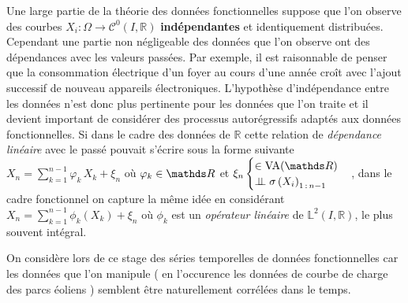 Une large partie de la théorie des données fonctionnelles suppose que l'on observe des courbes $X_i : \Omega \rightarrow \mathcal C^0(I, \mathds R)$ \textbf{indépendantes} et identiquement distribuées. Cependant une partie non négligeable des données que l'on observe ont des dépendances avec les valeurs passées. Par exemple, il est raisonnable de penser que la consommation électrique d'un foyer au cours d'une année croît avec l'ajout successif de nouveau appareils électroniques. L'hypothèse d'indépendance entre les données n'est donc plus pertinente pour les données que l'on traite et il devient important de considérer des processus autorégressifs adaptés aux données fonctionnelles. 
Si dans le cadre des données de $\mathds R$ cette relation de \emph{dépendance linéaire} avec le passé pouvait s'écrire sous la forme suivante 
$X_n = \sum\limits_{k=1}^{n-1} \varphi_k \, X_k + \xi_n$ où $\varphi_k \in \grandR$ 
et 
$\xi_n \begin{cases} \in \operatorname{VA}(\grandR) \\ \indep \sigma\left( X_i \right)_{1\,: \, n-1}\end{cases}$, 
dans le cadre fonctionnel on capture la même idée en considérant 
$X_n = \sum\limits_{k=1}^{n-1} \phi_k \left( X_k \right) + \xi_n$ où $\phi_k$ 
est un \emph{opérateur linéaire} de $\mathds L^2(I, \mathds R)$, 
le plus souvent intégral. 


On considère lors de ce stage des séries temporelles de données fonctionnelles car les données que l'on manipule ( en l'occurence les données de courbe de charge des parcs éoliens ) semblent être naturellement corrélées dans le temps. 



